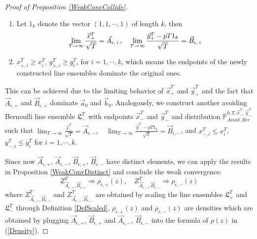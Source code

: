 \begin{proof}[Proof of Proposition \ref{WeakConvCollide}]
\begin{enumerate}
	\item Let $1_{k}$ denote the vector $(1,1,\cdots,1)$ of length $k$, then \begin{equation}{\label{Lim}}
		\lim_{T\rightarrow\infty}\frac{\vec{x}^{T}_{+}}{\sqrt{T}}=\vec{A}_{\epsilon,+},\quad \lim_{T\rightarrow\infty}\frac{\vec{y}^{T}_{+}-pT1_{k}}{\sqrt{T}}=\vec{B}_{\epsilon,+}
	\end{equation}
\item $x^{T}_{+,i}\geq x^{T}_i$, $y^{T}_{+,i}\geq y^{T}_i$, for $i=1,\cdots, k$, which means the endpoints of the newly constructed line ensembles dominate the original ones. 
\end{enumerate}
This can be achieved due to the limiting behavior of $\vec{x}^{T}_{+}$ and $\vec{y}^{T}_{+}$ and the fact that $\vec{A}_{\epsilon,+}$ and $\vec{B}_{\epsilon,+}$ dominate $\vec{a}_0$ and $\vec{b}_0$.
Analogously, we construct another avoiding Bernoulli line ensemble $\mathfrak{L}_{-}^{T}$ with endpoints $\vec{x}^{T}_{-}$ and $\vec{y}^{T}_{-}$ and distribution $\mathbb{P}_{Avoid,Ber}^{0,T,\vec{x}^{T}_{-},\vec{y}^{T}_{-}}$ such that $\lim_{T\rightarrow\infty}\frac{\vec{x}^{T}_{-}}{\sqrt{T}}=\vec{A}_{\epsilon,-},\quad \lim_{T\rightarrow\infty}\frac{\vec{y}^{T}_{-}-pT1_{k}}{\sqrt{T}}=\vec{B}_{\epsilon,-}$, and $x^{T}_{-,i}\leq x^{T}_{i}$, $y^{T}_{-,i}\leq y^{T}_{i}$ for $i=1,\cdots,k$.

Since now $\vec{A}_{\epsilon,+}$, $\vec{A}_{\epsilon,-}$, $\vec{B}_{\epsilon, +}$, $\vec{B}_{\epsilon,-}$ have distinct elements, we can apply the results in Proposition \ref{WeakConvDistinct} and conclude the weak convergence:
$$Z^{T}_{\vec{A}_{\epsilon,+}, \vec{B}_{\epsilon, +}}\Rightarrow \rho_{\epsilon,+}(z),\quad Z^{T}_{\vec{A}_{\epsilon,-}, \vec{B}_{\epsilon, -}}\Rightarrow \rho_{\epsilon,-}(z)$$
where $Z^{T}_{\vec{A}_{\epsilon,+},\vec{B}_{\epsilon,+}}$ and $Z^{T}_{\vec{A}_{\epsilon,-},\vec{B}_{\epsilon,-}}$ are obtained by scaling the line ensembles $\mathfrak{L}_{+}^{T}$ and $\mathfrak{L}_{-}^{T}$ through Definition \ref{DefScaled}, $\rho_{\epsilon,+}(z)$ and $\rho_{\epsilon,-}(z)$ are densities which are obtained by plugging $\vec{A}_{\epsilon,+}$, $\vec{B}_{\epsilon,+}$ and $\vec{A}_{\epsilon,-}$, $\vec{B}_{\epsilon,-}$ into the formula of $\rho(z)$ in (\ref{Density}).


\end{proof}
